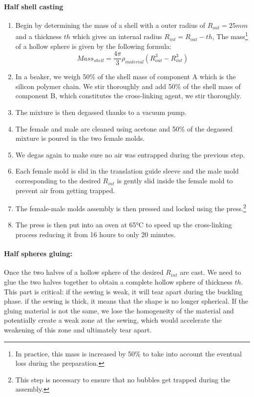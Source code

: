 \paragraph{Half shell casting}
\begin{enumerate}
	\item Begin by determining the mass of a shell with a outer radius of $R_{out}= 25 mm$ and a thickness $th$ which gives an internal radius $R_{int} = R_{out}-th$, The mass\footnote{In practice, this mass is increased by 50\% to take into account the eventual loss during the preparation.} of a hollow sphere is given by the following formula:
		\[Mass_{shell} = \frac{4\pi}{3}\rho_{material} (R_{out}^3-R_{int}^3) \]

	\item In a beaker, we weigh 50\% of the shell mass of component A which is the silicon polymer chain. We stir thoroughly and add 50\% of the shell mass of component B, which constitutes the cross-linking agent, we stir thoroughly.
	\item The mixture is then degassed thanks to a vacuum pump.
	\item The female and male are cleaned using acetone and 50\% of the degassed mixture is poured in the two female molds.
	\item We degas again to make sure no air was entrapped during the previous step.
	\item Each female mold is slid in the translation guide sleeve and the male mold corresponding to the desired $R_{int}$ is gently slid inside the female mold to prevent air from getting trapped.
	\item The female-male molds assembly is then pressed and locked using the press.\footnote{This step is necessary to ensure that no bubbles get trapped during the assembly.}
	\item The press is then put into an oven at 65°C to speed up the cross-linking process reducing it from 16 hours to only 20 minutes.
	
\end{enumerate}

\paragraph{Half spheres gluing:}
Once the two halves of a hollow sphere of the desired $R_{int}$ are cast. We need to glue the two halves together to obtain a complete hollow sphere of thickness $th$.
This part is critical: if the sewing is weak, it will tear apart during the buckling phase. if the sewing is thick, it means that the shape is no longer spherical. If the gluing material is not the same, we lose the homogeneity of the material and potentially create a weak zone at the sewing, which would accelerate the weakening of this zone and ultimately tear apart.
